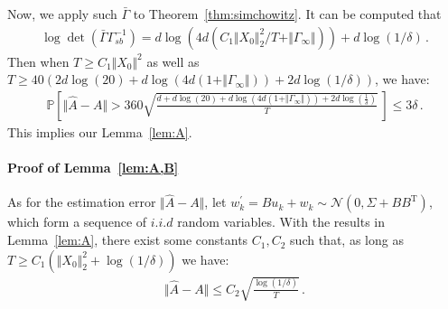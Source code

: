 \documentclass{article}
\theoremstyle{definition}
\begin{document}
Now, we apply such $\bar{\Gamma}$ to Theorem~\ref{thm:simchowitz}. It can be computed that \begin{align*}
\log\det(\bar{\Gamma}\Gamma^{-1}_{sb})=d\log\left(4d(C_{1}\Vert X_{0}\Vert ^{2}_{2}/T+\Vert \Gamma_{\infty}\Vert )\right)+d\log(1/\delta)\,.
\end{align*}
Then when $T\geq C_{1}\Vert X_{0}\Vert ^{2}$ as well as $T\geq 40\left(2d\log(20)+d\log(4d(1+\Vert \Gamma_{\infty}\Vert ))+2d\log(1/\delta)\right)$, we have:
\begin{align*}
\mathbb{P}\left[\Vert \hat{A}-A\Vert >360\sqrt{\frac{d+d\log(20)+d\log(4d(1+\Vert \Gamma_{\infty}\Vert ))+2d\log(\frac{1}{\delta})}{T}}\,\right]\leq 3\delta\,.
\end{align*}
This implies our Lemma~\ref{lem:A}.

\paragraph{Proof of Lemma~\ref{lem:A,B}}
As for the estimation error $\Vert \hat{A}-A\Vert $, let $w^{'}_{k}=Bu_{k}+w_{k}\sim\mathcal{N}(0,\Sigma+BB^{\mathrm{T}})$, which form a sequence of $i.i.d$ random variables. With the results in Lemma~\ref{lem:A}, there exist some constants $C_{1},C_{2}$ such that, as long as $T\geq C_{1}\left(\Vert X_{0}\Vert ^{2}_{2}+\log(1/\delta)\right)$ we have:
\begin{align*}
\Vert \hat{A}-A\Vert \leq C_{2}\sqrt{\frac{\log(1/\delta)}{T}}\,.
\end{align*}
\end{document}
